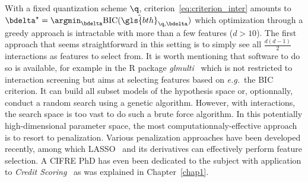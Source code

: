 With a fixed quantization scheme $\q$, criterion~\eqref{eq:criterion_inter} amounts to $\bdelta^\star = \argmin_{\bdelta} \text{BIC}(\hat{\gls{bth}}_{\q,\bdelta})$ which optimization through a greedy approach is intractable with more than a few features ($d > 10$). The first approach that seems straightforward in this setting is to simply see all $\frac{d(d-1)}{2}$ interactions as features to select from. It is worth mentioning that software to do so is available, for example in the \textsf{R} package \textit{glmulti}~\cite{calcagno2010glmulti} which is not restricted to interaction screening but aims at selecting features based on \textit{e.g.}\ the BIC criterion. It can build all subset models of the hypothesis space or, optionnally, conduct a random search using a genetic algorithm. However, with interactions, the search space is too vast to do such a brute force algorithm. In this potentially high-dimensional parameter space, the most computationnaly-effective approach is to resort to penalization. Various penalization approaches have been developed recently, among which LASSO~\cite{tibshirani1996regression} and its derivatives can effectively perform feature selection. A CIFRE PhD has even been dedicated to the subject with application to \textit{Credit Scoring}~\cite{vital2016} as was explained in Chapter~\ref{chap1}.

